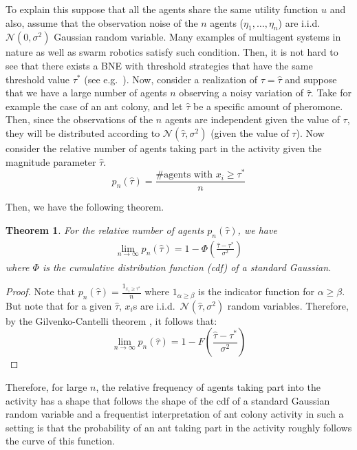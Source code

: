 \documentclass[conference]{ieeeconf}
\newtheorem{theorem}{Theorem}
\begin{document}
To explain this suppose that all the agents share the same utility function $u$ and also, assume that the observation noise of the $n$ agents ($\eta_1,\ldots,\eta_n$) are i.i.d.\ $\mathcal{N}(0,\sigma^2)$ Gaussian random variable. Many examples of multiagent systems in nature as well as swarm robotics satisfy such condition. Then, it is not hard to see that there exists a BNE with threshold strategies that have the same threshold value $\tau^*$ (see e.g.\ \cite{Morris2000}). Now, consider a realization of $\tau=\hat{\tau}$ and suppose that we have a large number of agents $n$ observing a noisy variation of $\hat{\tau}$. Take for example the case of an ant colony, and let $\hat{\tau}$ be a specific amount of pheromone. Then, since the observations of the $n$ agents are independent given the value of $\tau$, they will be distributed according to $\mathcal{N}(\hat{\tau},\sigma^2)$ (given the value of $\tau$). Now consider the relative number of agents taking part in the activity given the magnitude parameter $\hat{\tau}$.
\begin{equation}
	p_n(\hat{\tau})=\frac{\#\text{agents with }x_i\geq \tau^*}{n}
\end{equation}

Then, we have the following theorem.
\begin{theorem}\label{thrm:relativefrequency}
For the relative number of agents $p_n(\hat{\tau})$, we have
\begin{align}
\lim_{n\to\infty}p_n(\hat{\tau})=1-\Phi(\frac{\hat{\tau}-\tau^*}{\sigma^2})
\end{align}
where $\Phi$ is the cumulative distribution function (cdf) of a standard Gaussian. 
\end{theorem}
\begin{proof}
Note that $p_n(\hat{\tau})=\frac{1_{x_i\geq \tau^*}}{n}$ where $1_{\alpha\geq \beta}$ is the indicator function for $\alpha\geq \beta$. But note that for a given $\hat{\tau}$, $x_i$s are i.i.d.\ $\mathcal{N}(\hat{\tau},\sigma^2)$ random variables. Therefore, by the Gilvenko-Cantelli theorem \cite{durrett2010}, it follows that:
\begin{equation}
\lim_{n\to\infty}p_n(\hat{\tau})=1-F(\frac{\hat{\tau}-\tau^*}{\sigma^2})
\end{equation}

\end{proof}
Therefore, for large $n$, the relative frequency of agents taking part into the activity has a shape that follows the shape of the cdf of a standard Gaussian random variable and a frequentist interpretation of ant colony activity in such a setting is that the probability of an ant taking part in the activity roughly follows the curve of this function. 
\end{document}
